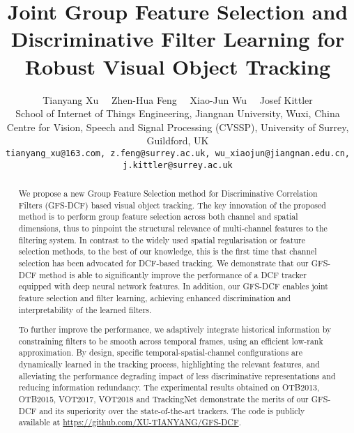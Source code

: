 \documentclass[10pt,twocolumn,letterpaper]{article}
\begin{document}
\title{Joint Group Feature Selection and Discriminative Filter Learning for Robust Visual Object Tracking}

\author{Tianyang Xu  ~~Zhen-Hua Feng  ~~Xiao-Jun Wu ~~Josef Kittler\\
School of Internet of Things Engineering, Jiangnan University, Wuxi, China\\
 Centre for Vision, Speech and Signal Processing (CVSSP), University of Surrey, Guildford, UK\\
{\tt\small tianyang\_xu@163.com, z.feng@surrey.ac.uk, wu\_xiaojun@jiangnan.edu.cn, j.kittler@surrey.ac.uk}
}

\maketitle
\ificcvfinal\thispagestyle{empty}\fi

\begin{abstract}
We propose a new Group Feature Selection method for Discriminative Correlation Filters (GFS-DCF) based visual object tracking. The key innovation of the proposed method is to perform group feature selection across both channel and spatial dimensions, thus to pinpoint the structural relevance of multi-channel features to the filtering system. In contrast to the widely used spatial regularisation or feature selection methods, to the best of our knowledge, this is the first time that channel selection has been advocated for DCF-based tracking. We demonstrate that our GFS-DCF method is able to significantly improve the performance of a DCF tracker equipped with deep neural network features. In addition, our GFS-DCF enables joint feature selection and filter learning, achieving enhanced discrimination and interpretability of the learned filters. 

To further improve the performance, we adaptively integrate historical information by constraining filters to be smooth across temporal frames, using an efficient low-rank approximation. By design, specific temporal-spatial-channel configurations are dynamically learned in the tracking process, highlighting the relevant features, and alleviating the performance degrading impact of less discriminative representations and reducing information redundancy. The experimental results obtained on OTB2013, OTB2015, VOT2017, VOT2018 and TrackingNet demonstrate the merits of our GFS-DCF and its superiority over the state-of-the-art trackers. The code is publicly available at \url{https://github.com/XU-TIANYANG/GFS-DCF}.
\end{abstract}
\end{document}
